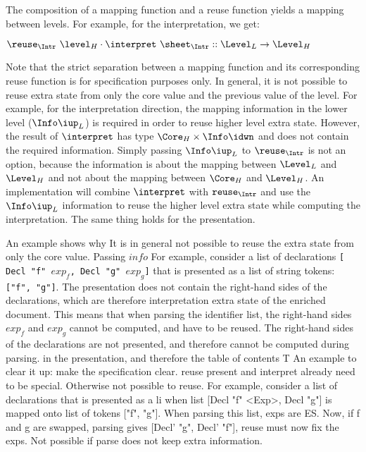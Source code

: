 The composition of a mapping function and a reuse function yields a mapping between levels. For example, for the interpretation, we get:

\begin{small}\begin{math}
\reuse_{\Intr}~\level_{H} \cdot \interpret~\sheet_{\Intr} :: \Level_{L} \rightarrow \Level_{H}
\end{math}\end{small} 

Note that the strict separation between a mapping function and its corresponding reuse function is for specification purposes only. In general, it is not possible to reuse extra state from only the core value and the previous value of the level. For example, for the interpretation direction, the mapping information in the lower level ($\Info\iup_{L}$) is required in order to reuse higher level extra state. However, the result of 
$\interpret$ has type $\Core_{H}\times \Info\idwn$ and does not contain the required information. Simply passing $\Info\iup_{L}$ to $\reuse_{\Intr}$ is not an option, because the information is about the mapping between $\Level_{L}$ and $\Level_{H}$ and not about the mapping between $\Core_{H}$ and $\Level_{H}$. An implementation will combine $\interpret$ with ${\tt reuse_{\Intr}}$ and use the $\Info\iup_{L}$ information to reuse the higher level extra state while computing the interpretation. The same thing holds for the presentation.


\bc
 An example shows why It is in general not possible to reuse the extra state from only the core value. Passing $info$
For example, consider a list of declarations {\tt [ Decl "f" $exp_f$, Decl "g" $exp_g$]} that is presented as a list of string tokens: {\tt ["f", "g"]}. The presentation does not contain the right-hand sides of the declarations, which are therefore interpretation extra state of the enriched document. This means that when parsing the identifier list, the right-hand sides $exp_f$ and $exp_g$ cannot be computed, and have to be reused. 
The right-hand sides of the declarations are not presented, and therefore cannot be computed during parsing. in the presentation, and therefore the table of contents T
An example to clear it up:
 make the specification clear. 
 reuse present and interpret already need to be special. Otherwise not possible to reuse. For example, consider a list of declarations that is presented as a li when list [Decl "f" <Exp>, Decl "g"] is mapped onto list of tokens ["f", "g"]. When parsing this list, exps are ES. Now, if f and g are swapped, parsing gives [Decl' "g", Decl' "f"],  reuse must now fix the exps. Not possible if parse does not keep extra information.
\ec

